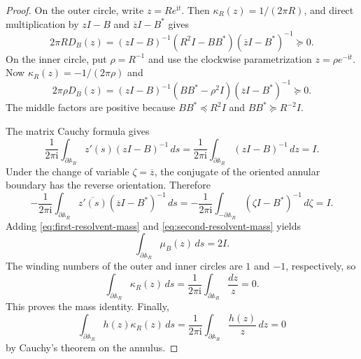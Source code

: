 \documentclass[preprints,article,submit,oneauthor]{Definitions/mdpi}
\theoremstyle{mdpi}
\theoremstyle{definition}
\newcommand{\iu}{\mathrm{i}}
\begin{document}
\begin{proof}
On the outer circle, write $z=Re^{\iu t}$.  Then
$\kappa_R(z)=1/(2\pi R)$, and direct multiplication by
$zI-B$ and $\overline zI-B^*$ gives
\begin{equation}
  2\pi R D_B(z)
  =(zI-B)^{-1}(R^2I-BB^*)
  (\overline zI-B^*)^{-1}\succeq0.
  \label{eq:outer-factorization}
\end{equation}
On the inner circle, put $\rho=R^{-1}$ and use the clockwise
parametrization $z=\rho e^{-\iu t}$.  Now
$\kappa_R(z)=-1/(2\pi\rho)$ and
\begin{equation}
  2\pi\rho D_B(z)
  =(zI-B)^{-1}(BB^*-\rho^2I)
  (\overline zI-B^*)^{-1}\succeq0.
  \label{eq:inner-factorization}
\end{equation}
The middle factors are positive because
$BB^*\preceq R^2I$ and $BB^*\succeq R^{-2}I$.

The matrix Cauchy formula gives
\begin{equation}
  \frac1{2\pi\iu}\int_{\partial\mathbb A_R}
  z'(s)(zI-B)^{-1}\,ds
  =\frac1{2\pi\iu}\int_{\partial\mathbb A_R}
  (zI-B)^{-1}\,dz=I.
  \label{eq:first-resolvent-mass}
\end{equation}
Under the change of variable $\zeta=\overline z$, the conjugate of the
oriented annular boundary has the reverse orientation.  Therefore
\begin{equation}
  -\frac1{2\pi\iu}\int_{\partial\mathbb A_R}
  \overline{z'(s)}(\overline zI-B^*)^{-1}\,ds
  =-\frac1{2\pi\iu}\int_{-\partial\mathbb A_R}
  (\zeta I-B^*)^{-1}\,d\zeta=I.
  \label{eq:second-resolvent-mass}
\end{equation}
Adding \eqref{eq:first-resolvent-mass} and
\eqref{eq:second-resolvent-mass} yields
\begin{equation}
  \int_{\partial\mathbb A_R}\mu_B(z)\,ds=2I.
  \label{eq:mu-mass}
\end{equation}
The winding numbers of the outer and inner circles are $1$ and $-1$,
respectively, so
\[
  \int_{\partial\mathbb A_R}\kappa_R(z)\,ds
  =\frac1{2\pi\iu}\int_{\partial\mathbb A_R}\frac{dz}{z}=0.
\]
This proves the mass identity.  Finally,
\[
  \int_{\partial\mathbb A_R}h(z)\kappa_R(z)\,ds
  =\frac1{2\pi\iu}
  \int_{\partial\mathbb A_R}\frac{h(z)}z\,dz=0
\]
by Cauchy's theorem on the annulus.
\end{proof}
\end{document}
